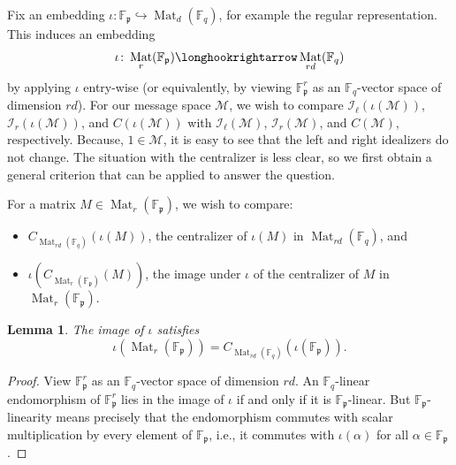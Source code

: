 \documentclass[12pt]{amsart}
\newtheorem{lem}[thm]{Lemma}
\theoremstyle{definition}
\theoremstyle{remark}
\numberwithin{equation}{section}
\numberwithin{thm}{section}
\DeclareMathOperator{\Mat}{Mat}
\newcommand{\fp}{\mathfrak{p}}
\newcommand{\cI}{\mathcal{I}}
\newcommand{\cM}{\mathcal{M}}
\newcommand{\F}{\mathbb{F}}
\begin{document}
 Fix an embedding $\iota\colon \F_\fp\hookrightarrow \Mat_d(\F_q)$, for example the regular representation. This induces an embedding 
 \[
 \iota\colon \Mat_r(\F_\fp) \longhookrightarrow \Mat_{rd}(\F_q)
 \]
 by applying $\iota$ entry-wise (or equivalently, by viewing $\F_\fp^r$ as an $\F_q$-vector space of dimension $rd$). 
 For our message space $\cM$, we wish to compare $\cI_\ell(\iota(\cM))$, $\cI_r(\iota(\cM))$, and 
 $C(\iota(\cM))$ with $\cI_\ell(\cM)$, $\cI_r(\cM)$, and $C(\cM)$, respectively.  Because, $1\in \cM$, it is easy to see that the left and right 
 idealizers do not change. The situation with the centralizer is less clear, 
 so we first obtain a general criterion that can be applied to answer the question. 
 
 For a matrix $M\in \Mat_r(\F_\fp)$, we wish to compare:
 \begin{itemize}
 	\item $C_{\Mat_{rd}(\F_q)}(\iota(M))$, the centralizer of $\iota(M)$ in $\Mat_{rd}(\F_q)$, and 
 	\item $\iota\left(C_{\Mat_r(\F_\fp)}(M)\right)$, the image under $\iota$ of the centralizer of $M$ in $\Mat_r(\F_\fp)$.  
 \end{itemize}
 
 \begin{lem}\label{lemC(F_p)}
 	The image of $\iota$ satisfies 
 	\[
 	\iota(\Mat_r(\F_\fp)) = C_{\Mat_{rd}(\F_q)}(\iota(\F_\fp)). 
 	\]
 \end{lem}
 \begin{proof}
 	View $\F_\fp^r$ as an $\F_q$-vector space of dimension $rd$. An $\F_q$-linear endomorphism of $\F_\fp^r$ lies 
 	in the image of $\iota$ if and only if it is $\F_\fp$-linear. But $\F_\fp$-linearity means precisely that the endomorphism 
 	commutes with scalar multiplication by every element of $\F_\fp$, i.e., it commutes with $\iota(\alpha)$ for all $\alpha\in \F_\fp$. 
 \end{proof}
 
\end{document}
